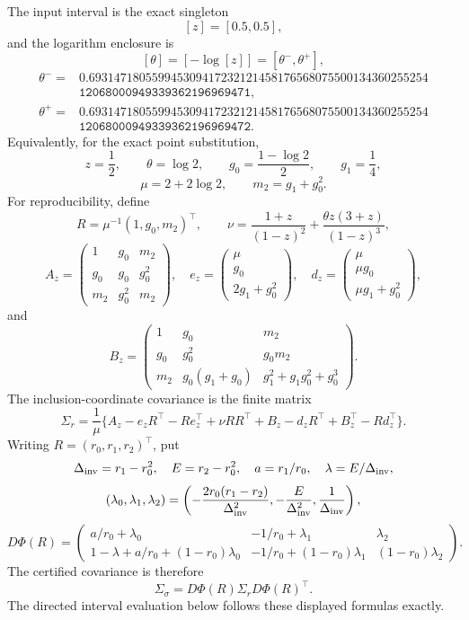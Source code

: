 The input interval is the exact singleton
\[
[z]=[0.5,0.5],
\]
and the logarithm enclosure is
\[
[\theta]=[-\log [z]]=[\theta^-,\theta^+],
\]
\[
\begin{aligned}
\theta^-={}&
\mathtt{0.693147180559945309417232121458176568075500134360255254}\\
&\mathtt{12068000949339362196969471},\\
\theta^+={}&
\mathtt{0.693147180559945309417232121458176568075500134360255254}\\
&\mathtt{12068000949339362196969472}.
\end{aligned}
\]
Equivalently, for the exact point substitution,
\[
z=\frac12,\qquad
\theta=\log2,\qquad
g_0=\frac{1-\log2}{2},\qquad
g_1=\frac14,
\]
\[
\mu=2+2\log2,\qquad
m_2=g_1+g_0^2.
\]
For reproducibility, define
\[
R=\mu^{-1}(1,g_0,m_2)^\top,\qquad
\nu=\frac{1+z}{(1-z)^2}+\frac{\theta z(3+z)}{(1-z)^3},
\]
\[
A_z=\begin{pmatrix}
1&g_0&m_2\\ g_0&g_0&g_0^2\\ m_2&g_0^2&m_2
\end{pmatrix},\quad
e_z=\begin{pmatrix}\mu\\g_0\\2g_1+g_0^2\end{pmatrix},\quad
d_z=\begin{pmatrix}\mu\\\mu g_0\\\mu g_1+g_0^2\end{pmatrix},
\]
and
\[
B_z=\begin{pmatrix}
1&g_0&m_2\\
g_0&g_0^2&g_0m_2\\
m_2&g_0(g_1+g_0)&g_1^2+g_1g_0^2+g_0^3
\end{pmatrix}.
\]
The inclusion-coordinate covariance is the finite matrix
\[
\Sigma_r=\frac1\mu\{A_z-e_zR^\top-Re_z^\top+\nu RR^\top
+B_z-d_zR^\top+B_z^\top-Rd_z^\top\}.
\]
Writing \(R=(r_0,r_1,r_2)^\top\), put
\[
\Delta_{\rm inv}=r_1-r_0^2,\quad E=r_2-r_0^2,\quad
a=r_1/r_0,\quad \lambda=E/\Delta_{\rm inv},
\]
\[
(\lambda_0,\lambda_1,\lambda_2)=
\left(-\frac{2r_0(r_1-r_2)}{\Delta_{\rm inv}^2},
-\frac{E}{\Delta_{\rm inv}^2},\frac1{\Delta_{\rm inv}}\right),
\]
\[
D\Phi(R)=\begin{pmatrix}
a/r_0+\lambda_0&-1/r_0+\lambda_1&\lambda_2\\
1-\lambda+a/r_0+(1-r_0)\lambda_0&
-1/r_0+(1-r_0)\lambda_1&(1-r_0)\lambda_2
\end{pmatrix}.
\]
The certified covariance is therefore
\[
\Sigma_\sigma=D\Phi(R)\Sigma_rD\Phi(R)^\top.
\]
The directed interval evaluation below follows these displayed formulas
exactly.

